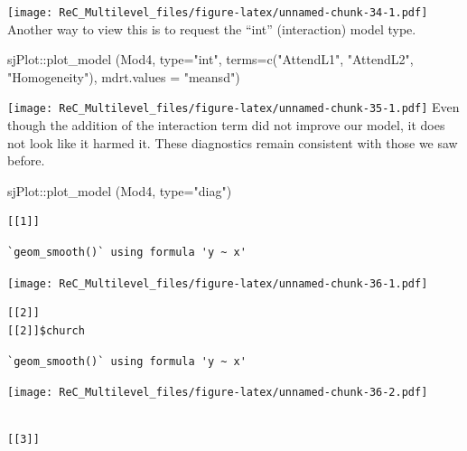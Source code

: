 \documentclass[
  11pt,
]{book}
\newenvironment{Shaded}{\begin{snugshade}}{\end{snugshade}}
\newcommand{\AttributeTok}[1]{\textcolor[rgb]{0.77,0.63,0.00}{#1}}
\newcommand{\FunctionTok}[1]{\textcolor[rgb]{0.00,0.00,0.00}{#1}}
\newcommand{\NormalTok}[1]{#1}
\newcommand{\SpecialCharTok}[1]{\textcolor[rgb]{0.00,0.00,0.00}{#1}}
\newcommand{\StringTok}[1]{\textcolor[rgb]{0.31,0.60,0.02}{#1}}
\begin{document}
\texttt{[image: ReC\_Multilevel\_files/figure-latex/unnamed-chunk-34-1.pdf]}
Another way to view this is to request the ``int'' (interaction) model type.

\begin{Shaded}
\begin{Highlighting}[]
\NormalTok{sjPlot}\SpecialCharTok{::}\FunctionTok{plot\_model}\NormalTok{ (Mod4, }\AttributeTok{type=}\StringTok{"int"}\NormalTok{, }\AttributeTok{terms=}\FunctionTok{c}\NormalTok{(}\StringTok{"AttendL1"}\NormalTok{, }\StringTok{"AttendL2"}\NormalTok{, }\StringTok{"Homogeneity"}\NormalTok{), }\AttributeTok{mdrt.values =} \StringTok{"meansd"}\NormalTok{)}
\end{Highlighting}
\end{Shaded}

\texttt{[image: ReC\_Multilevel\_files/figure-latex/unnamed-chunk-35-1.pdf]}
Even though the addition of the interaction term did not improve our model, it does not look like it harmed it. These diagnostics remain consistent with those we saw before.

\begin{Shaded}
\begin{Highlighting}[]
\NormalTok{sjPlot}\SpecialCharTok{::}\FunctionTok{plot\_model}\NormalTok{ (Mod4, }\AttributeTok{type=}\StringTok{"diag"}\NormalTok{)}
\end{Highlighting}
\end{Shaded}

\begin{verbatim}
[[1]]
\end{verbatim}

\begin{verbatim}
`geom_smooth()` using formula 'y ~ x'
\end{verbatim}

\texttt{[image: ReC\_Multilevel\_files/figure-latex/unnamed-chunk-36-1.pdf]}

\begin{verbatim}
[[2]]
[[2]]$church
\end{verbatim}

\begin{verbatim}
`geom_smooth()` using formula 'y ~ x'
\end{verbatim}

\texttt{[image: ReC\_Multilevel\_files/figure-latex/unnamed-chunk-36-2.pdf]}

\begin{verbatim}

[[3]]
\end{verbatim}
\end{document}
